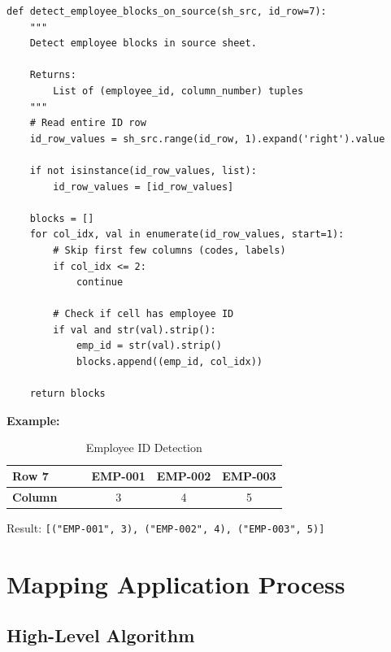 \begin{lstlisting}[style=pythonstyle]
def detect_employee_blocks_on_source(sh_src, id_row=7):
    """
    Detect employee blocks in source sheet.
    
    Returns:
        List of (employee_id, column_number) tuples
    """
    # Read entire ID row
    id_row_values = sh_src.range(id_row, 1).expand('right').value
    
    if not isinstance(id_row_values, list):
        id_row_values = [id_row_values]
    
    blocks = []
    for col_idx, val in enumerate(id_row_values, start=1):
        # Skip first few columns (codes, labels)
        if col_idx <= 2:
            continue
        
        # Check if cell has employee ID
        if val and str(val).strip():
            emp_id = str(val).strip()
            blocks.append((emp_id, col_idx))
    
    return blocks
\end{lstlisting}

\textbf{Example:}

\begin{table}[H]
\centering
\begin{tabular}{|l|l|c|c|c|c|}
\hline
\textbf{Row 7} & & & EMP-001 & EMP-002 & EMP-003 \\
\hline
\textbf{Column} & & & 3 & 4 & 5 \\
\hline
\end{tabular}
\caption{Employee ID Detection}
\end{table}

Result: \texttt{[("EMP-001", 3), ("EMP-002", 4), ("EMP-003", 5)]}

\section{Mapping Application Process}

\subsection{High-Level Algorithm}

